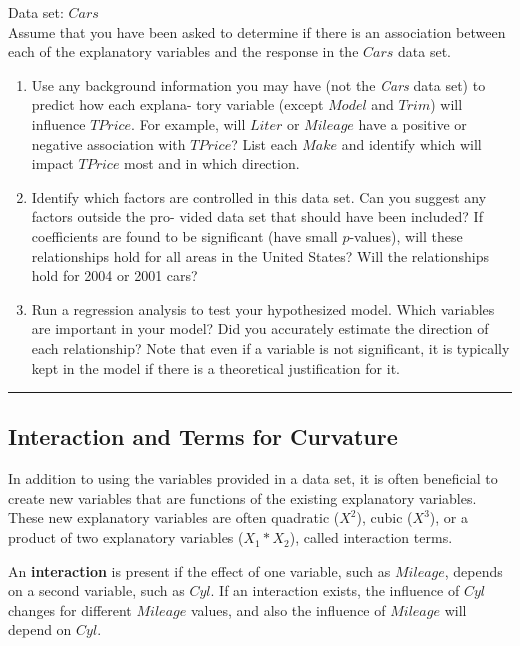 \documentclass[
]{report}
\theoremstyle{definition}
\theoremstyle{definition}
\theoremstyle{definition}
\theoremstyle{definition}
\theoremstyle{remark}
\begin{document}
Data set: \(Cars\)\\
Assume that you have been asked to determine if there is an association between each of the explanatory
variables and the response in the \(Cars\) data set.

\begin{enumerate}
\def\labelenumi{\arabic{enumi}.}
\setcounter{enumi}{31}
\item
  Use any background information you may have (not the \emph{Cars} data set) to predict how each explana-
  tory variable (except \(Model\) and \(Trim\)) will influence \(TPrice\). For example, will \(Liter\) or \(Mileage\)
  have a positive or negative association with \(TPrice\)? List each \(Make\) and identify which will impact
  \(TPrice\) most and in which direction.
\item
  Identify which factors are controlled in this data set. Can you suggest any factors outside the pro-
  vided data set that should have been included? If coefficients are found to be significant (have small
  \(p\)-values), will these relationships hold for all areas in the United States? Will the relationships hold for 2004 or 2001 cars?
\item
  Run a regression analysis to test your hypothesized model. Which variables are important in your model? Did you accurately estimate the direction of each relationship? Note that even if a variable is not significant, it is typically kept in the model if there is a theoretical justification
  for it.
\end{enumerate}

\begin{center}\rule{0.5\linewidth}{0.5pt}\end{center}

\hypertarget{interaction-and-terms-for-curvature}{%
\subsection{Interaction and Terms for Curvature}\label{interaction-and-terms-for-curvature}}

In addition to using the variables provided in a data set, it is often beneficial to create new variables that are functions of the existing explanatory variables. These new explanatory variables are often quadratic (\(X^2\)), cubic (\(X^3\)), or a product of two explanatory variables (\(X_1*X_2\)), called interaction terms.

An \textbf{interaction} is present if the effect of one variable, such as \(Mileage\), depends on a second variable, such as \(Cyl\). If an interaction exists, the influence of \(Cyl\) changes for different \(Mileage\) values, and also the influence of \(Mileage\) will depend on \(Cyl\).
\end{document}
